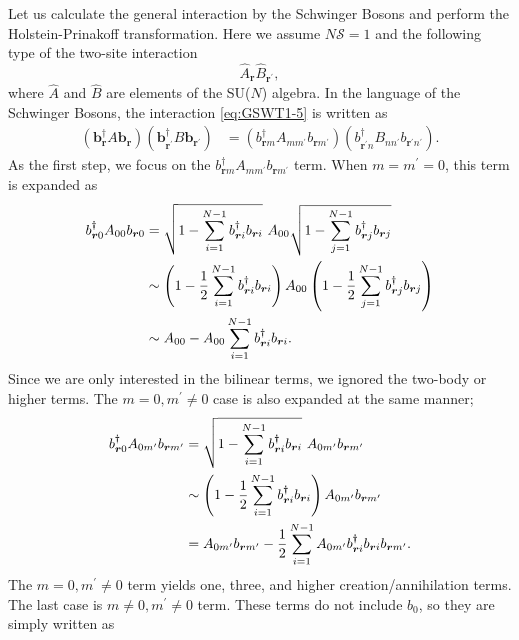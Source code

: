 \documentclass[11pt, aps, longbibliography]{article}
\begin{document}
Let us calculate the general interaction by the Schwinger Bosons and perform the Holstein-Prinakoff transformation.
Here we assume $N\mathcal{S}=1$ and the following type of the two-site interaction
\begin{equation}\label{eq:GSWT1-5}
    \hat{A}_{\bm{r}}\hat{B}_{\bm{r^\prime}},
\end{equation}
where $\hat{A}$ and $\hat{B}$ are elements of the SU($N$) algebra.
In the language of the Schwinger Bosons, the interaction \eqref{eq:GSWT1-5} is written as 
\begin{align}\label{eq:GSWT1-6}
    (\mathbf{b}_{\bm{r}}^\dagger A\mathbf{b}_{\bm{r}})(\mathbf{b}_{\bm{r}^\prime}^\dagger B\mathbf{b}_{\bm{r}^\prime}) &= (b_{\bm{r}m}^\dagger A_{mm^\prime}b_{\bm{r}m^\prime})(b_{\bm{r}^\prime n}^\dagger B_{nn^\prime}b_{\bm{r}^\prime n^\prime}).
\end{align}
As the first step, we focus on the $b_{\bm{r}m}^\dagger A_{mm^\prime}b_{\bm{r}m^\prime}$ term. 
When $m=m^\prime=0$, this term is expanded as
\begin{align}\label{eq:GSWT1-7}
    b_{\bm{r}0}^\dagger A_{00}b_{\bm{r}0} &= \sqrt{1-\sum_{i=1}^{N-1}b_{\bm{r}i}^\dagger b_{\bm{r}i}} \ A_{00}  \sqrt{1-\sum_{j=1}^{N-1}b_{\bm{r}j}^\dagger b_{\bm{r}j}} \notag \\
    &\sim \left( 1-\frac{1}{2}\sum_{i=1}^{N-1}b_{\bm{r}i}^\dagger b_{\bm{r}i} \right) A_{00} \left( 1-\frac{1}{2}\sum_{j=1}^{N-1}b_{\bm{r}j}^\dagger b_{\bm{r}j} \right) \notag \\ 
    &\sim A_{00} - A_{00}\sum_{i=1}^{N-1} b_{\bm{r}i}^\dagger b_{\bm{r}i} .
\end{align}
Since we are only interested in the bilinear terms, we ignored the two-body or higher terms.
The $m=0, m^\prime \neq 0$ case is also expanded at the same manner;
\begin{align}\label{eq:GSWT1-8}
    b_{\bm{r}0}^\dagger A_{0m^\prime}b_{\bm{r}m^\prime} &= \sqrt{1-\sum_{i=1}^{N-1}b_{\bm{r}i}^\dagger b_{\bm{r}i}} \ A_{0m^\prime}b_{\bm{r}m^\prime} \notag \\
    &\sim \left( 1-\frac{1}{2}\sum_{i=1}^{N-1}b_{\bm{r}i}^\dagger b_{\bm{r}i} \right) A_{0m^\prime}b_{\bm{r}m^\prime} \notag \\ 
    &=A_{0m^\prime}b_{\bm{r}m^\prime} -\frac{1}{2}\sum_{i=1}^{N-1} A_{0m^\prime} b_{\bm{r}i}^\dagger b_{\bm{r}i}b_{\bm{r}m^\prime} .
\end{align}
The $m=0, m^\prime \neq 0$ term yields one, three, and higher creation/annihilation terms. 
The last case is $m\neq 0, m^\prime \neq 0$ term. These terms do not include $b_0$, so they are simply written as
\end{document}
